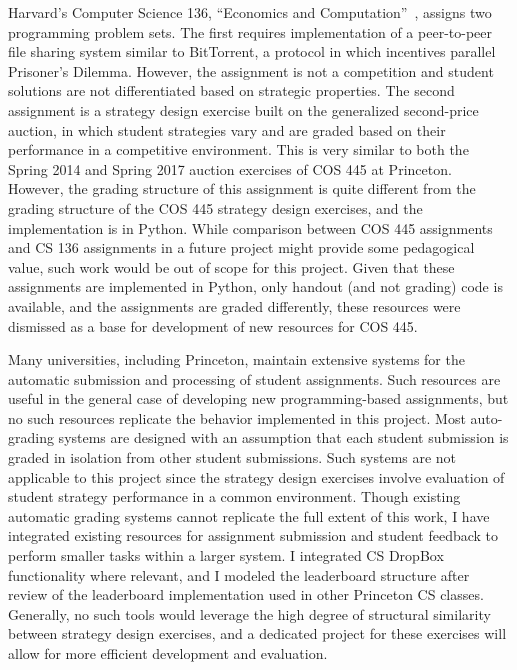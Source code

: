 \documentclass[pageno]{jpaper}
\begin{document}
Harvard's Computer Science 136, ``Economics and Computation''~\cite{https://beta.blogs.harvard.edu/k108875/assignments/}, assigns two programming problem sets.
The first requires implementation of a peer-to-peer file sharing system similar to BitTorrent, a protocol in which incentives parallel Prisoner's Dilemma.
However, the assignment is not a competition and student solutions are not differentiated based on strategic properties.
The second assignment is a strategy design exercise built on the generalized second-price auction, in which student strategies vary and are graded based on their performance in a competitive environment.
This is very similar to both the Spring 2014 and Spring 2017 auction exercises of COS 445 at Princeton.
However, the grading structure of this assignment is quite different from the grading structure of the COS 445 strategy design exercises, and the implementation is in Python.
While comparison between COS 445 assignments and CS 136 assignments in a future project might provide some pedagogical value, such work would be out of scope for this project.
Given that these assignments are implemented in Python, only handout (and not grading) code is available, and the assignments are graded differently, these resources were dismissed as a base for development of new resources for COS 445.

Many universities, including Princeton, maintain extensive systems for the automatic submission and processing of student assignments.
Such resources are useful in the general case of developing new programming-based assignments, but no such resources replicate the behavior implemented in this project.
Most auto-grading systems are designed with an assumption that each student submission is graded in isolation from other student submissions.
Such systems are not applicable to this project since the strategy design exercises involve evaluation of student strategy performance in a common environment.
Though existing automatic grading systems cannot replicate the full extent of this work, I have integrated existing resources for assignment submission and student feedback to perform smaller tasks within a larger system.
I integrated CS DropBox~\cite{https://csguide.cs.princeton.edu/academic/csdropbox} functionality where relevant, and I modeled the leaderboard structure after review of the leaderboard implementation used in other Princeton CS classes.
Generally, no such tools would leverage the high degree of structural similarity between strategy design exercises, and a dedicated project for these exercises will allow for more efficient development and evaluation.
\end{document}
